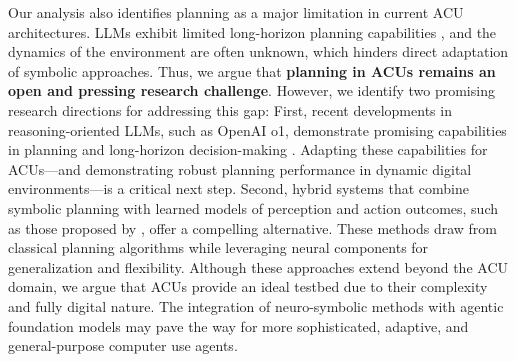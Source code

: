 Our analysis also identifies planning as a major limitation in current ACU architectures. 
LLMs exhibit limited long-horizon planning capabilities \citep{valmeekam2023planning}, and the dynamics of the environment are often unknown, which hinders direct adaptation of symbolic approaches.
Thus, we argue that \textbf{planning in ACUs remains an open and pressing research challenge}. However, we identify two promising research directions for addressing this gap:
First, recent developments in reasoning-oriented LLMs, such as OpenAI o1, demonstrate promising capabilities in planning and long-horizon decision-making \citep{valmeekam2024llms, tan_towards_2024}. 
Adapting these capabilities for ACUs—and demonstrating robust planning performance in dynamic digital environments—is a critical next step.
Second, hybrid systems that combine symbolic planning with learned models of perception and action outcomes, such as those proposed by \citet{koh_tree_2024}, offer a compelling alternative. These methods draw from classical planning algorithms \citep[Chapter~11]{russell_artificial_2022} while leveraging neural components for generalization and flexibility.
Although these approaches extend beyond the ACU domain, we argue that ACUs provide an ideal testbed due to their complexity and fully digital nature. The integration of neuro-symbolic methods with agentic foundation models may pave the way for more sophisticated, adaptive, and general-purpose computer use agents.